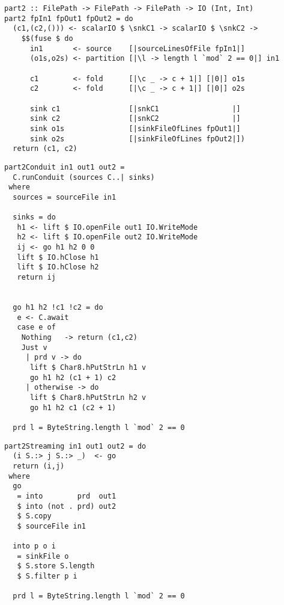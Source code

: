 \begin{lstlisting}[float,label=l:bench:part2Folderol,caption=Folderol implementation of \Hs/part2/]
part2 :: FilePath -> FilePath -> FilePath -> IO (Int, Int)
part2 fpIn1 fpOut1 fpOut2 = do
  (c1,(c2,())) <- scalarIO $ \snkC1 -> scalarIO $ \snkC2 ->
    $$(fuse $ do
      in1       <- source    [|sourceLinesOfFile fpIn1|]
      (o1s,o2s) <- partition [|\l -> length l `mod` 2 == 0|] in1

      c1        <- fold      [|\c _ -> c + 1|] [|0|] o1s
      c2        <- fold      [|\c _ -> c + 1|] [|0|] o2s

      sink c1                [|snkC1                 |]
      sink c2                [|snkC2                 |]
      sink o1s               [|sinkFileOfLines fpOut1|]
      sink o2s               [|sinkFileOfLines fpOut2|])
  return (c1, c2)
\end{lstlisting}

\begin{lstlisting}[float,label=l:a:bench:part2Conduit,caption=Conduit implementation of \Hs/part2/]
part2Conduit in1 out1 out2 =
  C.runConduit (sources C..| sinks)
 where
  sources = sourceFile in1

  sinks = do
   h1 <- lift $ IO.openFile out1 IO.WriteMode
   h2 <- lift $ IO.openFile out2 IO.WriteMode
   ij <- go h1 h2 0 0
   lift $ IO.hClose h1
   lift $ IO.hClose h2
   return ij


  go h1 h2 !c1 !c2 = do
   e <- C.await
   case e of
    Nothing   -> return (c1,c2)
    Just v
     | prd v -> do
      lift $ Char8.hPutStrLn h1 v
      go h1 h2 (c1 + 1) c2
     | otherwise -> do
      lift $ Char8.hPutStrLn h2 v
      go h1 h2 c1 (c2 + 1)

  prd l = ByteString.length l `mod` 2 == 0
\end{lstlisting}

\begin{lstlisting}[float,label=l:a:bench:part2Streaming,caption=Streaming implementation of \Hs/part2/]
part2Streaming in1 out1 out2 = do
  (i S.:> j S.:> _)  <- go
  return (i,j)
 where
  go
   = into        prd  out1
   $ into (not . prd) out2
   $ S.copy
   $ sourceFile in1

  into p o i
   = sinkFile o
   $ S.store S.length
   $ S.filter p i

  prd l = ByteString.length l `mod` 2 == 0
\end{lstlisting}


